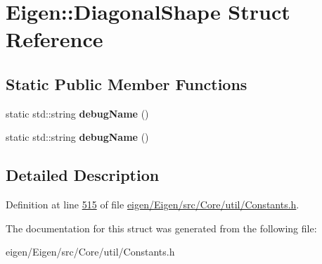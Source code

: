 \hypertarget{struct_eigen_1_1_diagonal_shape}{}\section{Eigen\+:\+:Diagonal\+Shape Struct Reference}
\label{struct_eigen_1_1_diagonal_shape}
\subsection*{Static Public Member Functions}
\begin{DoxyCompactItemize}
\item 
\mbox{\label{struct_eigen_1_1_diagonal_shape_a8de4e0b884709c83e6411719b95da29a}} 
static std\+::string {\bfseries debug\+Name} ()
\item 
\mbox{\label{struct_eigen_1_1_diagonal_shape_a8de4e0b884709c83e6411719b95da29a}} 
static std\+::string {\bfseries debug\+Name} ()
\end{DoxyCompactItemize}


\subsection{Detailed Description}


Definition at line \hyperlink{eigen_2_eigen_2src_2_core_2util_2_constants_8h_source_l00515}{515} of file \hyperlink{eigen_2_eigen_2src_2_core_2util_2_constants_8h_source}{eigen/\+Eigen/src/\+Core/util/\+Constants.\+h}.



The documentation for this struct was generated from the following file\+:\begin{DoxyCompactItemize}
\item 
eigen/\+Eigen/src/\+Core/util/\+Constants.\+h\end{DoxyCompactItemize}
